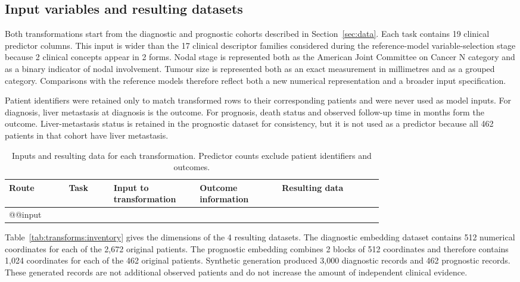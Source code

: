 \subsection{Input variables and resulting datasets}
\label{sec:transforms:inventory}

Both transformations start from the diagnostic and prognostic cohorts described
in Section~\ref{sec:data}. Each task contains 19 clinical predictor columns. This
input is wider than the 17 clinical descriptor families considered during the
reference-model variable-selection stage because 2 clinical concepts appear in
2 forms. Nodal stage is represented both as the American Joint Committee on
Cancer N category and as a binary indicator of nodal involvement. Tumour size is
represented both as an exact measurement in millimetres and as a grouped
category. Comparisons with the reference models therefore reflect both a new
numerical representation and a broader input specification.

Patient identifiers were retained only to match transformed rows to their
corresponding patients and were never used as model inputs. For diagnosis, liver
metastasis at diagnosis is the outcome. For prognosis, death status and observed
follow-up time in months form the outcome. Liver-metastasis status is retained in
the prognostic dataset for consistency, but it is not used as a predictor because
all 462 patients in that cohort have liver metastasis.

\begin{table}[htbp]
\centering\footnotesize
\caption{Inputs and resulting data for each transformation. Predictor counts
exclude patient identifiers and outcomes.}
\label{tab:transforms:schema}
\begin{tabularx}{\linewidth}{@{}p{0.16\linewidth}p{0.12\linewidth}p{0.23\linewidth}p{0.22\linewidth}Y@{}}
\toprule
Route & Task & Input to transformation & Outcome information & Resulting data \\
\midrule
\csname @@input
\bottomrule
\end{tabularx}
\end{table}

Table~\ref{tab:transforms:inventory} gives the dimensions of the 4 resulting
datasets. The diagnostic embedding dataset contains 512 numerical coordinates
for each of the 2,672 original patients. The prognostic embedding combines 2
blocks of 512 coordinates and therefore contains 1,024 coordinates for each of
the 462 original patients. Synthetic generation produced 3,000 diagnostic
records and 462 prognostic records. These generated records are not additional
observed patients and do not increase the amount of independent clinical
evidence.

